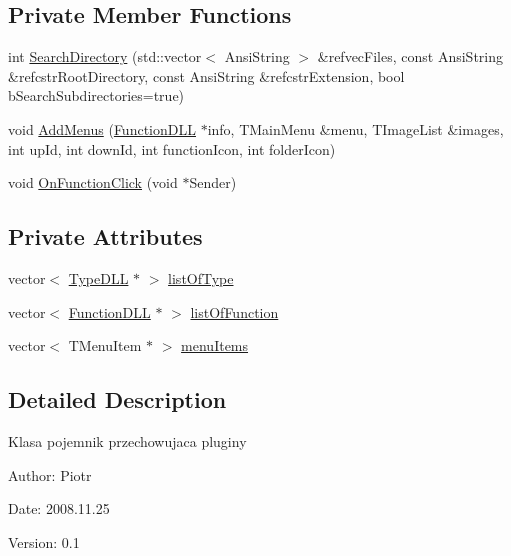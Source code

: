 \subsection*{Private Member Functions}
\begin{CompactItemize}
\item 
int \hyperlink{classPluginContener_0ee8809bd8743d5eb0c233185bee1c6b}{SearchDirectory} (std::vector$<$ AnsiString $>$ \&refvecFiles, const AnsiString \&refcstrRootDirectory, const AnsiString \&refcstrExtension, bool bSearchSubdirectories=true)
\item 
void \hyperlink{classPluginContener_715587c2fae1c1bc6d3b6ea6d601b2bb}{AddMenus} (\hyperlink{classFunctionDLL}{FunctionDLL} $\ast$info, TMainMenu \&menu, TImageList \&images, int upId, int downId, int functionIcon, int folderIcon)
\item 
void \hyperlink{classPluginContener_cd1a48f16b62158ba9fef9b9796eafdf}{OnFunctionClick} (void $\ast$Sender)
\end{CompactItemize}
\subsection*{Private Attributes}
\begin{CompactItemize}
\item 
vector$<$ \hyperlink{classTypeDLL}{TypeDLL} $\ast$ $>$ \hyperlink{classPluginContener_a075645708492a1517095a6906321ee6}{listOfType}
\item 
vector$<$ \hyperlink{classFunctionDLL}{FunctionDLL} $\ast$ $>$ \hyperlink{classPluginContener_6e6397c16d1ec7bb6beff37edebb5a8f}{listOfFunction}
\item 
vector$<$ TMenuItem $\ast$ $>$ \hyperlink{classPluginContener_98824bc6704781e23fa586436e51a5bb}{menuItems}
\end{CompactItemize}


\subsection{Detailed Description}
Klasa pojemnik przechowujaca pluginy \begin{Desc}
\item[Author:]Piotr \end{Desc}
\begin{Desc}
\item[Date:]2008.11.25 \end{Desc}
\begin{Desc}
\item[Version:]0.1 \end{Desc}



